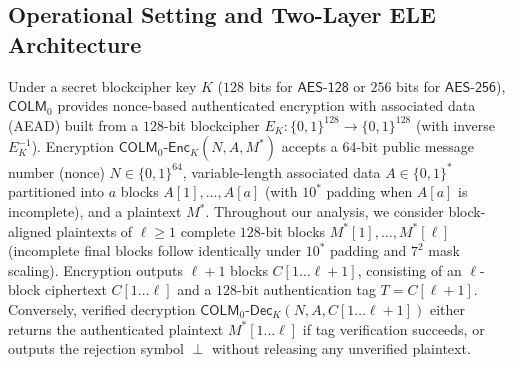 \documentclass[11pt,a4paper]{article}
\theoremstyle{definition}
\theoremstyle{remark}
\newcommand{\COLMzero}{\mathsf{COLM}_0}
\begin{document}
\subsection{Operational Setting and Two-Layer ELE Architecture}
\label{subsec:arch-overview}
Under a secret blockcipher key $K$ ($128$ bits for $\mathsf{AES\text{-}128}$ or $256$ bits for $\mathsf{AES\text{-}256}$), $\COLMzero$ provides nonce-based authenticated encryption with associated data (AEAD) built from a $128$-bit blockcipher $E_K : \{0,1\}^{128} \to \{0,1\}^{128}$ (with inverse $E_K^{-1}$). Encryption $\mathsf{COLM}_0\text{-}\mathsf{Enc}_K(N, A, M^*)$ accepts a $64$-bit public message number (nonce) $N \in \{0,1\}^{64}$, variable-length associated data $A \in \{0,1\}^*$ partitioned into $a$ blocks $A[1], \dots, A[a]$ (with $10^*$ padding when $A[a]$ is incomplete), and a plaintext $M^*$. Throughout our analysis, we consider block-aligned plaintexts of $\ell \ge 1$ complete $128$-bit blocks $M^*[1], \dots, M^*[\ell]$ (incomplete final blocks follow identically under $10^*$ padding and $7^2$ mask scaling). Encryption outputs $\ell + 1$ blocks $C[1 \dots \ell+1]$, consisting of an $\ell$-block ciphertext $C[1 \dots \ell]$ and a $128$-bit authentication tag $T = C[\ell+1]$. Conversely, verified decryption $\mathsf{COLM}_0\text{-}\mathsf{Dec}_K(N, A, C[1 \dots \ell+1])$ either returns the authenticated plaintext $M^*[1 \dots \ell]$ if tag verification succeeds, or outputs the rejection symbol $\perp$ without releasing any unverified plaintext.
\end{document}
